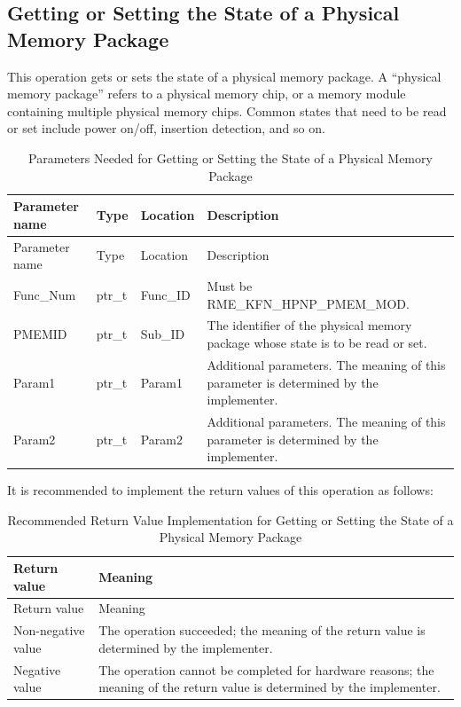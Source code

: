 \subsection{Getting or Setting the State of a Physical Memory Package}\label{subsec:8-get-or-set-physical-memory-package-state}

This operation gets or sets the state of a physical memory package. A ``physical memory package'' refers to a physical memory chip, or a memory module containing multiple physical memory chips. Common states that need to be read or set include power on/off, insertion detection, and so on.

\begin{xltabular}{\textwidth}{@{}>{\hsize\raggedright\arraybackslash}X>{\hsize\raggedright\arraybackslash}X>{\hsize\raggedright\arraybackslash}X>{\hsize\raggedright\arraybackslash}X@{}}
\caption{Parameters Needed for Getting or Setting the State of a Physical Memory Package}\label{tab:8-40-get-or-set-physical-memory-package-state-parameters}\\
\toprule
Parameter name & Type & Location & Description\tabularnewline
\endfirsthead
\toprule
Parameter name & Type & Location & Description\tabularnewline
\midrule
\endhead
\bottomrule
\endlastfoot
Func\_Num & ptr\_t & Func\_ID & Must be RME\_KFN\_HPNP\_PMEM\_MOD.\tabularnewline
PMEMID & ptr\_t & Sub\_ID &
The identifier of the physical memory package whose state is to be read or set.\tabularnewline
Param1 & ptr\_t & Param1 &
Additional parameters. The meaning of this parameter is determined by the implementer.\tabularnewline
Param2 & ptr\_t & Param2 &
Additional parameters. The meaning of this parameter is determined by the implementer.\tabularnewline
\end{xltabular}
\nopagebreak[4]

It is recommended to implement the return values of this operation as follows:

\begin{xltabular}{\textwidth}{@{}>{\hsize\raggedright\arraybackslash}X>{\hsize\raggedright\arraybackslash}X@{}}
\caption{Recommended Return Value Implementation for Getting or Setting the State of a Physical Memory Package}\label{tab:8-41-get-or-set-physical-memory-package-state-suggested-return-values}\\
\toprule
Return value & Meaning\tabularnewline
\endfirsthead
\toprule
Return value & Meaning\tabularnewline
\midrule
\endhead
\bottomrule
\endlastfoot
    Non-negative value & The operation succeeded; the meaning of the return value is determined by the implementer.\tabularnewline
    Negative value & The operation cannot be completed for hardware reasons; the meaning of the return value is determined by the implementer.\tabularnewline
\end{xltabular}
\nopagebreak[4]

